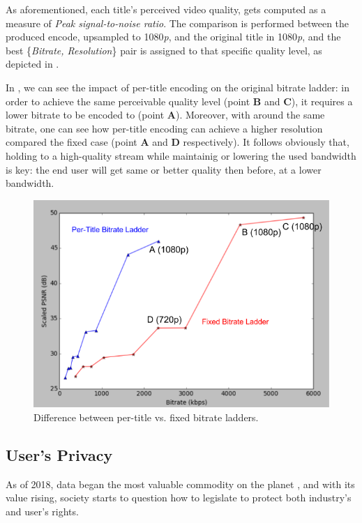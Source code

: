 As aforementioned, each title's perceived video quality, gets computed as a
measure of \emph{Peak signal-to-noise ratio}. The comparison is performed
between the produced encode, upsampled to 1080\emph{p}, and the original title
in 1080\emph{p}, and the best \{\emph{Bitrate, Resolution}\} pair is assigned
to that specific quality level, as depicted in .

In , we can see the impact of per-title encoding on
the original bitrate ladder: in order to achieve the same perceivable quality
level (point \textbf{B} and \textbf{C}), it requires a lower bitrate to be
encoded to (point \textbf{A}).  Moreover, with around the same bitrate, one can
see how per-title encoding can achieve a higher resolution compared the fixed
case (point \textbf{A} and \textbf{D} respectively). It follows obviously that,
holding to a high-quality stream while maintainig or lowering the used
bandwidth is key: the end user will get same or better quality then before, at
a lower bandwidth.

\begin{figure}[!htb]
  \centering
  \includegraphics[width=0.9\columnwidth]{img/pertitlevsfixed.png}
  \caption{Difference between per-title vs. fixed bitrate ladders.}
  \label{fig:new-vs-old-ladder}
\end{figure}

\subsection{User's Privacy}\label{sec:privacy}

As of 2018, data began the most valuable commodity on the planet
\cite{data-value}, and with its value rising, society starts to question how to
legislate to protect both industry's and user's rights.

